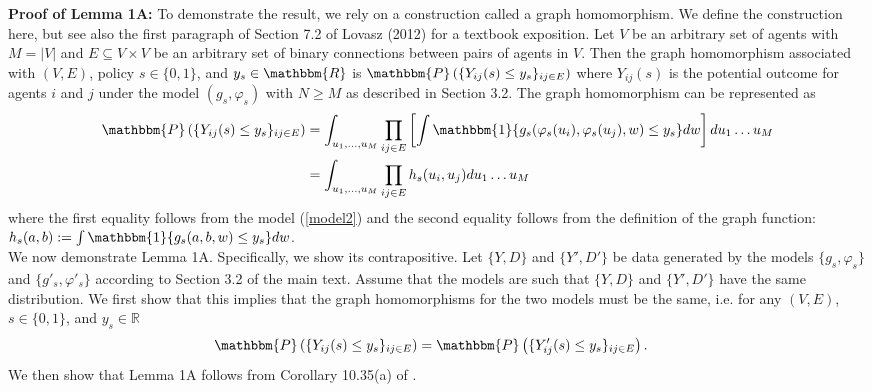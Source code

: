 \documentclass[12pt]{article}
\theoremstyle{definition}
\begin{document}
\begin{flushleft}
\textbf{Proof of Lemma 1A:} To demonstrate the result, we rely on a construction called a graph homomorphism. We define the construction here, but see also the first paragraph of Section 7.2 of Lovasz (2012) for a textbook exposition. Let $V$ be an arbitrary set of agents with $M = |V|$ and $E \subseteq V \times V$ be an arbitrary set of binary connections between pairs of agents in $V$. Then the graph homomorphism associated with $(V,E)$, policy $s \in \{0,1\}$, and $y_s \in \mathbbm{R}$ is $\mathbbm{P}\left( \{Y_{ij}(s) \leq y_s\}_{ij \in E}\right)$ where $Y_{ij}(s)$ is the potential outcome for agents $i$ and $j$ under the model $(g_{s},\varphi_{s})$ with $N \geq M$ as described in Section 3.2. The graph homomorphism can be represented as 
\begin{align*}
\mathbbm{P}\left( \{Y_{ij}(s) \leq y_s\}_{ij \in E}\right) 
&= \int_{u_1,\ldots,u_{M}}\prod_{ij \in E}\left[\int \mathbbm{1}\{g_{s}(\varphi_s(u_i),\varphi_s(u_j),w) \leq y_s\}dw\right]du_1\ldots u_{M} \\
&=  \int_{u_1,\ldots,u_{M}}\prod_{ij \in E}h_{s}(u_i,u_j)du_1\ldots u_{M}
\end{align*}
where the first equality follows from the model (\ref{model2}) and the second equality follows from the definition of the graph function: $h_{s}(a,b) := \int \mathbbm{1}\{g_{s}(a,b,w) \leq y_s\}dw$. \newline \\


We now demonstrate Lemma 1A. Specifically, we show its contrapositive. Let $\{Y,D\}$ and $\{Y',D'\}$ be data generated by the models $\{g_{s},\varphi_s\}$ and $\{g'_{s},\varphi'_s\}$ according to Section 3.2 of the main text. Assume that the models are such that $\{Y,D\}$ and $\{Y',D'\}$ have the same distribution. We first show that this implies that the graph homomorphisms for the two models must be the same, i.e. for any  $(V,E)$, $s \in \{0,1\}$, and $y_s \in \mathbb{R}$
\begin{align*}
\mathbbm{P}\left( \{Y_{ij}(s) \leq y_s\}_{ij \in E}\right) &= \mathbbm{P}\left( \{Y'_{ij}(s) \leq y_s\}_{ij \in E}\right).
\end{align*}
We then show that Lemma 1A follows from Corollary 10.35(a) of \cite{lovasz2012large}. \newline \\


\end{flushleft}
\end{document}
